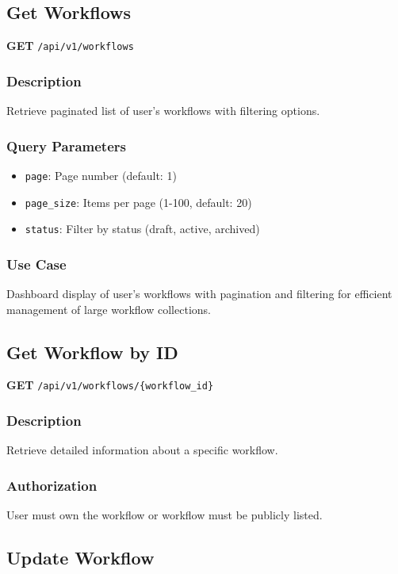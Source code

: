 \documentclass[11pt,a4paper]{report}
\begin{document}
\subsection{Get Workflows}

\textbf{GET} \texttt{/api/v1/workflows}

\subsubsection{Description}
Retrieve paginated list of user's workflows with filtering options.

\subsubsection{Query Parameters}
\begin{itemize}[leftmargin=*]
    \item \texttt{page}: Page number (default: 1)
    \item \texttt{page\_size}: Items per page (1-100, default: 20)
    \item \texttt{status}: Filter by status (draft, active, archived)
\end{itemize}

\subsubsection{Use Case}
Dashboard display of user's workflows with pagination and filtering for efficient management of large workflow collections.

\subsection{Get Workflow by ID}

\textbf{GET} \texttt{/api/v1/workflows/\{workflow\_id\}}

\subsubsection{Description}
Retrieve detailed information about a specific workflow.

\subsubsection{Authorization}
User must own the workflow or workflow must be publicly listed.

\subsection{Update Workflow}
\end{document}
